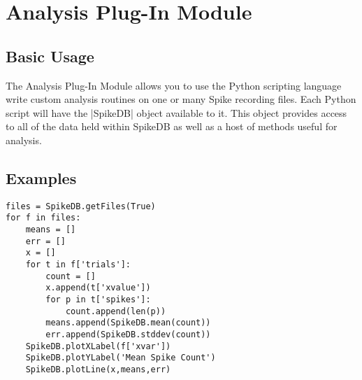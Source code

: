 \documentclass{report}
\begin{document}
\chapter{Analysis Plug-In Module}

\section{Basic Usage}
The Analysis Plug-In Module allows you to use the Python scripting language write custom analysis routines on one or many Spike recording files. Each Python script will have the |SpikeDB| object available to it.  This object provides access to all of the data held within SpikeDB as well as a host of methods useful for analysis.

\section{Examples}
\begin{lstlisting}[label=codeMean,caption=Calculating the mean spike counts.]
files = SpikeDB.getFiles(True)
for f in files:
	means = []
	err = []
	x = []
	for t in f['trials']:
		count = []
		x.append(t['xvalue'])	
		for p in t['spikes']:
			count.append(len(p))
		means.append(SpikeDB.mean(count))
		err.append(SpikeDB.stddev(count))
	SpikeDB.plotXLabel(f['xvar'])
	SpikeDB.plotYLabel('Mean Spike Count')
	SpikeDB.plotLine(x,means,err)
\end{lstlisting}
\end{document}
